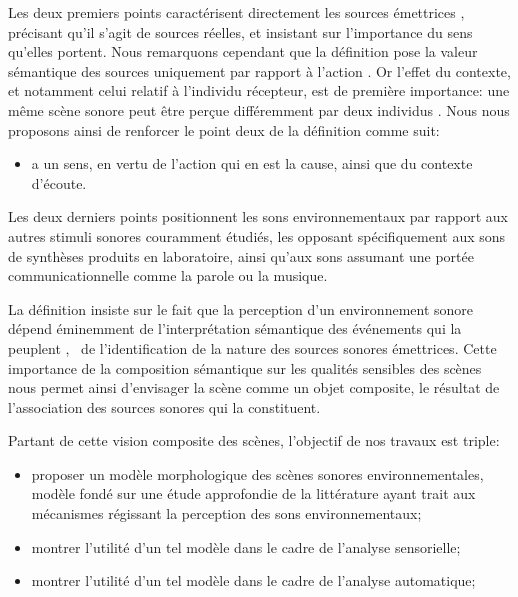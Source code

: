 Les deux premiers points caractérisent directement les sources émettrices , précisant qu'il s'agit de sources réelles, et insistant sur l'importance du sens qu'elles portent. Nous remarquons cependant que la définition pose la valeur sémantique des sources uniquement par rapport à l'action  . Or l'effet du contexte, et notamment celui relatif à l'individu récepteur, est de première importance: une même scène sonore peut être perçue différemment par deux individus . Nous nous proposons ainsi de renforcer le point deux de la définition comme suit:

\begin{itemize}
\setcounter{enumi}{2}
\item a un sens, en vertu de l'action qui en est la cause, ainsi que du contexte d'écoute.
\end{itemize}

Les deux derniers points positionnent les sons environnementaux par rapport aux autres stimuli sonores couramment étudiés, les opposant spécifiquement aux sons de synthèses produits en laboratoire, ainsi qu'aux sons assumant une portée communicationnelle comme la parole ou la musique.

La définition insiste sur le fait que la perception d'un environnement sonore dépend éminemment de l'interprétation sémantique des événements qui la peuplent , \ie~de l'identification de la nature des sources sonores émettrices. Cette importance de la composition sémantique sur les qualités sensibles des scènes nous permet ainsi d'envisager la scène comme un objet composite, le résultat de l'association des sources sonores qui la constituent.

Partant de cette vision composite des scènes, l'objectif de nos travaux est triple:

\begin{itemize}
\item proposer un modèle morphologique des scènes sonores environnementales, modèle fondé sur une étude approfondie de la littérature ayant trait aux mécanismes régissant la perception des sons environnementaux;
\item montrer l'utilité d'un tel modèle dans le cadre de l'analyse sensorielle;
\item montrer l'utilité d'un tel modèle dans le cadre de l'analyse automatique;
\end{itemize}

